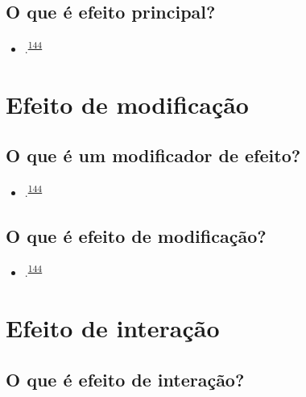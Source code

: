 \documentclass[
  a4paper,
]{book}
\providecommand{\tightlist}{%
  \setlength{\itemsep}{0pt}\setlength{\parskip}{0pt}}
\begin{document}
\hypertarget{o-que-uxe9-efeito-principal}{%
\subsection{O que é efeito principal?}\label{o-que-uxe9-efeito-principal}}

\begin{itemize}
\tightlist
\item
  .\textsuperscript{\protect\hyperlink{ref-Bours2023}{144}}
\end{itemize}

\hypertarget{modificacao}{%
\section{Efeito de modificação}\label{modificacao}}

\hypertarget{o-que-uxe9-um-modificador-de-efeito}{%
\subsection{O que é um modificador de efeito?}\label{o-que-uxe9-um-modificador-de-efeito}}

\begin{itemize}
\tightlist
\item
  .\textsuperscript{\protect\hyperlink{ref-Bours2023}{144}}
\end{itemize}

\hypertarget{o-que-uxe9-efeito-de-modificauxe7uxe3o}{%
\subsection{O que é efeito de modificação?}\label{o-que-uxe9-efeito-de-modificauxe7uxe3o}}

\begin{itemize}
\tightlist
\item
  .\textsuperscript{\protect\hyperlink{ref-Bours2023}{144}}
\end{itemize}

\hypertarget{interacao}{%
\section{Efeito de interação}\label{interacao}}

\hypertarget{o-que-uxe9-efeito-de-interauxe7uxe3o}{%
\subsection{O que é efeito de interação?}\label{o-que-uxe9-efeito-de-interauxe7uxe3o}}
\end{document}
